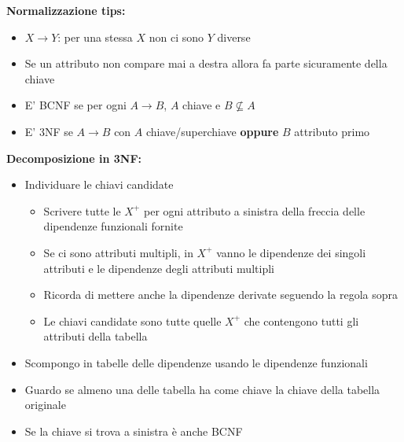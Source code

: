 \documentclass[10pt]{article}
\begin{document}
\textbf{Normalizzazione tips:}
\begin{itemize}
    \item $X \rightarrow Y$: per una stessa $X$ non ci sono $Y$ diverse
    \item Se un attributo non compare mai a destra allora fa parte sicuramente della chiave
    \item E' BCNF se per ogni $A\rightarrow B$, $A$ chiave e $B \nsubseteq A$
    \item E' 3NF se $A\rightarrow B$ con $A$ chiave/superchiave \textbf{oppure} $B$ attributo primo
\end{itemize}
\textbf{Decomposizione in 3NF:}
\begin{itemize}
    \item Individuare le chiavi candidate \begin{itemize}
        \item Scrivere tutte le $X^{+}$ per ogni attributo a sinistra della freccia delle dipendenze funzionali fornite
        \item Se ci sono attributi multipli, in $X^{+}$ vanno le dipendenze dei singoli attributi e le dipendenze degli attributi multipli
        \item Ricorda di mettere anche la dipendenze derivate seguendo la regola sopra
        \item Le chiavi candidate sono tutte quelle $X^{+}$ che contengono tutti gli attributi della tabella
    \end{itemize}
    \item Scompongo in tabelle delle dipendenze usando le dipendenze funzionali
    \item Guardo se almeno una delle tabella ha come chiave la chiave della tabella originale
    \item Se la chiave si trova a sinistra è anche BCNF
\end{itemize}
\end{document}
